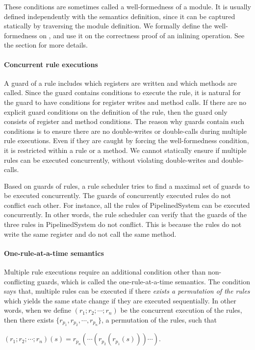 These conditions are sometimes called a well-formedness of a
module. It is usually defined independently with the semantics
definition, since it can be captured statically by traversing the
module definition. We formally define the well-formedness on
, and use it on the correctness proof of an inlining
operation. See the section for more details.

\paragraph{Concurrent rule executions}

A guard of a rule includes which registers are written and which
methods are called. Since the guard contains conditions to execute the
rule, it is natural for the guard to have conditions for register
writes and method calls. If there are no explicit guard conditions on
the definition of the rule, then the guard only consists of register
and method conditions. The reason why guards contain such conditions
is to ensure there are no double-writes or double-calls during
multiple rule executions. Even if they are caught by forcing the
well-formedness condition, it is restricted within a rule or a
method. We cannot statically ensure if multiple rules can be executed
concurrently, without violating double-writes and double-calls.

Based on guards of rules, a rule scheduler tries to find a maximal set
of guards to be executed concurrently. The guards of concurrently
executed rules do not conflict each other. For instance, all the rules
of PipelinedSystem can be executed concurrently. In other words, the
rule scheduler can verify that the guards of the three rules in
PipelinedSystem do not conflict. This is because the rules do not
write the same register and do not call the same method.

\paragraph{One-rule-at-a-time semantics}

Multiple rule executions require an additional condition other than
non-conflicting guards, which is called the one-rule-at-a-time
semantics. The condition says that, multiple rules can be executed if
there \emph{exists a permutation of the rules} which yields the same
state change if they are executed sequentially. In other words, when
we define $(r_1; r_2; \cdots; r_n)$ be the concurrent execution of the
rules, then there exists $\{r_{p_1}, r_{p_2}, \cdots, r_{p_n}\}$, a
permutation of the rules, such that
\begin{center}
  \begin{math}
    (r_1; r_2; \cdots; r_n)(s) = r_{p_n}(\cdots(r_{p_2}(r_{p_1}(s)))\cdots).
  \end{math}
\end{center}

